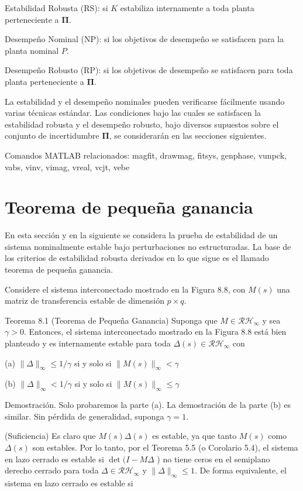 Estabilidad Robusta (RS): si $K$ estabiliza internamente a toda planta perteneciente a $\boldsymbol{\Pi}$.

Desempeño Nominal (NP): si los objetivos de desempeño se satisfacen para la planta nominal $P$.

Desempeño Robusto (RP): si los objetivos de desempeño se satisfacen para toda planta perteneciente a $\boldsymbol{\Pi}$.

La estabilidad y el desempeño nominales pueden verificarse fácilmente usando varias técnicas estándar. Las condiciones bajo las cuales se satisfacen la estabilidad robusta y el desempeño robusto, bajo diversos supuestos sobre el conjunto de incertidumbre $\boldsymbol{\Pi}$, se considerarán en las secciones siguientes.

Comandos MATLAB relacionados: magfit, drawmag, fitsys, genphase, vunpck, vabs, vinv, vimag, vreal, vcjt, vebe

\section{Teorema de pequeña ganancia}
En esta sección y en la siguiente se considera la prueba de estabilidad de un sistema nominalmente estable bajo perturbaciones no estructuradas. La base de los criterios de estabilidad robusta derivados en lo que sigue es el llamado teorema de pequeña ganancia.

Considere el sistema interconectado mostrado en la Figura 8.8, con $M(s)$ una matriz de transferencia estable de dimensión $p \times q$.

Teorema 8.1 (Teorema de Pequeña Ganancia) Suponga que $M \in \mathcal{R} \mathcal{H}_{\infty}$ y sea $\gamma>0$. Entonces, el sistema interconectado mostrado en la Figura 8.8 está bien planteado y es internamente estable para toda $\Delta(s) \in \mathcal{R} \mathcal{H}_{\infty}$ con

(a) $\|\Delta\|_{\infty} \leq 1 / \gamma$ si y solo si $\|M(s)\|_{\infty}<\gamma$

(b) $\|\Delta\|_{\infty}<1 / \gamma$ si y solo si $\|M(s)\|_{\infty} \leq \gamma$


Demostración. Solo probaremos la parte (a). La demostración de la parte (b) es similar. Sin pérdida de generalidad, suponga $\gamma=1$.

(Suficiencia) Es claro que $M(s) \Delta(s)$ es estable, ya que tanto $M(s)$ como $\Delta(s)$ son estables. Por lo tanto, por el Teorema 5.5 (o Corolario 5.4), el sistema en lazo cerrado es estable si $\operatorname{det}(I-M \Delta$ ) no tiene ceros en el semiplano derecho cerrado para toda $\Delta \in \mathcal{R} \mathcal{H}_{\infty}$ y $\|\Delta\|_{\infty} \leq 1$. De forma equivalente, el sistema en lazo cerrado es estable si

